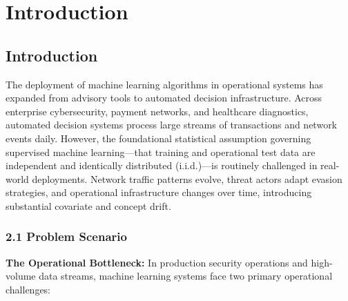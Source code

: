 \chapter{Introduction}

\section{Introduction}

The deployment of machine learning algorithms in operational systems has expanded from advisory tools to automated decision infrastructure. Across enterprise cybersecurity, payment networks, and healthcare diagnostics, automated decision systems process large streams of transactions and network events daily. However, the foundational statistical assumption governing supervised machine learning---that training and operational test data are independent and identically distributed (i.i.d.)---is routinely challenged in real-world deployments. Network traffic patterns evolve, threat actors adapt evasion strategies, and operational infrastructure changes over time, introducing substantial covariate and concept drift.

\subsection{2.1 Problem Scenario}

\textbf{The Operational Bottleneck:} In production security operations and high-volume data streams, machine learning systems face two primary operational challenges:

